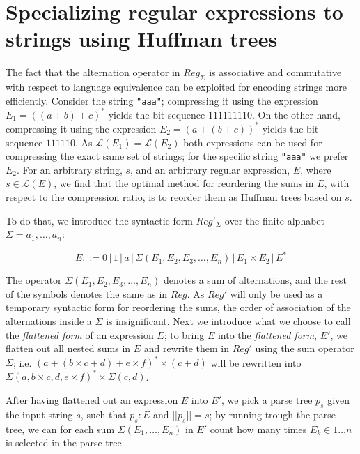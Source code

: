 \documentclass[a4paper, oneside]{memoir}
\theoremstyle{definition}
\begin{document}
\chapter{Specializing regular expressions to strings using Huffman trees}
\label{chap:huffman}
\label{chap:specialize_huffman}

The fact that the alternation operator in $Reg_{\Sigma}$ is associative and
commutative with respect to language equivalence can be exploited for encoding
strings more efficiently. Consider the string \texttt{"aaa"}; compressing it
using the expression $E_1 = ((a + b) + c)^{*}$ yields the bit sequence
$111111110$. On the other hand, compressing it using the expression $E_2 = (a +
(b + c))^{*}$ yields the bit sequence $111110$. As $\mathcal{L}(E_1) =
\mathcal{L}(E_2)$ both expressions can be used for compressing the exact same
set of strings; for the specific string \texttt{"aaa"} we prefer $E_2$. For an
arbitrary string, $s$, and an arbitrary regular expression, $E$, where $s \in
\mathcal{L}(E)$, we find that the optimal method for reordering the sums in $E$,
with respect to the compression ratio, is to reorder them as Huffman trees based
on $s$.

To do that, we introduce the syntactic form $Reg'_\Sigma$ over the finite
alphabet $\Sigma = {a_1, \dots, a_n}$:

\[
    E ::= 0 \, | \, 1 \, | \, a \, | \, \Sigma(E_1, E_2, E_3, \dots, E_n) \, | \, E_1 \times E_2 \, | \, E^{*}
\]

The operator $\Sigma(E_1, E_2, E_3, \dots, E_n)$ denotes a sum of alternations,
and the rest of the symbols denotes the same as in $Reg$. As $Reg'$ will only be
used as a temporary syntactic form for reordering the sums, the order of
association of the alternations inside a $\Sigma$ is insignificant.  Next we
introduce what we choose to call the \emph{flattened form} of an expression $E$;
to bring $E$ into the \emph{flattened form}, $E'$, we flatten out all nested
sums in $E$ and rewrite them in $Reg'$ using the sum operator $\Sigma$; i.e. $(a
+ (b \times c + d) + e \times f)^{*} \times (c + d)$ will be rewritten into
$\Sigma(a, b \times c, d, e \times f)^{*} \times \Sigma{(c, d)}$.

After having flattened out an expression $E$ into $E'$, we pick a parse tree
$p_s$ given the input string $s$, such that $p_s : E$ and $||p_s|| = s$; by
running trough the parse tree, we can for each sum $\Sigma(E_1, \dots, E_n)$ in
$E'$ count how many times $E_k \in 1 \dots n$ is selected in the parse tree.
\end{document}
